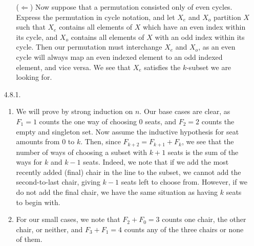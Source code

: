 \documentclass[11pt,letterpaper]{article}
\begin{document}
\begin{enumerate}
\begin{enumerate}
        ($\Leftarrow$) Now suppose that a permutation consisted only of even cycles. Express the permutation in cycle notation, and let $X_e$ and $X_o$ partition $X$ such that $X_e$ contains all elements of $X$ which have an even index within its cycle, and $X_o$ contains all elements of $X$ with an odd index within its cycle. Then our permutation must interchange $X_e$ and $X_o$, as an even cycle will always map an even indexed element to an odd indexed element, and vice versa. We see that $X_e$ satisfies the $k$-subset we are looking for.
    \end{enumerate}
    \item[4.8.1.]
    \begin{enumerate}
        \item We will prove by strong induction on $n$. Our base cases are clear, as $F_1=1$ counts the one way of choosing 0 seats, and $F_2=2$ counts the empty and singleton set. Now assume the inductive hypothesis for seat amounts from 0 to $k$. Then, since $F_{k+2}=F_{k+1}+F_{k}$, we see that the number of ways of choosing a subset with $k+1$ seats is the sum of the ways for $k$ and $k-1$ seats. Indeed, we note that if we add the most recently added (final) chair in the line to the subset, we cannot add the second-to-last chair, giving $k-1$ seats left to choose from. However, if we do not add the final chair, we have the same situation as having $k$ seats to begin with.
        \item For our small cases, we note that $F_2+F_0=3$ counts one chair, the other chair, or neither, and $F_3+F_1=4$ counts any of the three chairs or none of them.
        

\end{enumerate}
\end{enumerate}
\end{document}
